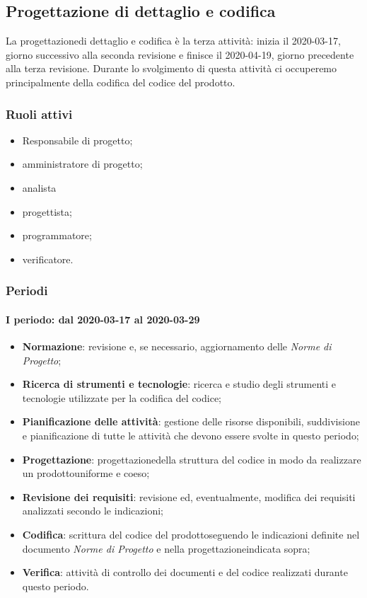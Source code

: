 \subsection{Progettazione di dettaglio e codifica}
La progettazione\glosp di dettaglio e codifica è la terza attività: inizia il 2020-03-17, giorno successivo alla seconda revisione e finisce il 2020-04-19, giorno precedente alla terza revisione. Durante lo svolgimento di questa attività ci occuperemo principalmente della codifica del codice del prodotto\glo.

\subsubsection{Ruoli attivi}
\begin{itemize}
	\item Responsabile di progetto\glo;
	\item amministratore di progetto\glo;
	\item analista
	\item progettista;
	\item programmatore;
	\item verificatore.
\end{itemize}

\subsubsection{Periodi}
\paragraph*{I periodo: dal 2020-03-17 al 2020-03-29}
\begin{itemize}
	\item \textbf{Normazione}: revisione e, se necessario, aggiornamento delle \textit{Norme di Progetto};
	\item \textbf{Ricerca di strumenti e tecnologie}: ricerca e studio degli strumenti e tecnologie utilizzate per la codifica del codice;
	\item \textbf{Pianificazione delle attività}: gestione delle risorse disponibili, suddivisione e pianificazione di tutte le attività che devono essere svolte in questo periodo;
	\item \textbf{Progettazione}\glo: progettazione\glosp della struttura del codice in modo da realizzare un prodotto\glosp uniforme e coeso;
	\item \textbf{Revisione dei requisiti}: revisione ed, eventualmente, modifica dei requisiti analizzati secondo le indicazioni; 
	\item \textbf{Codifica}: scrittura del codice del prodotto\glosp seguendo le indicazioni definite nel documento \textit{Norme di Progetto} e nella progettazione\glosp indicata sopra; 
	\item \textbf{Verifica}: attività di controllo dei documenti e del codice realizzati durante questo periodo.
\end{itemize}

